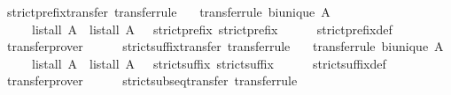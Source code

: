 \begin{isabellebody}
%
\isadelimproof
\isanewline
%
\endisadelimproof
\isanewline
{}\isamarkupfalse%
\ strict{\isacharunderscore}prefix{\isacharunderscore}transfer\ {\isacharbrackleft}transfer{\isacharunderscore}rule{\isacharbrackright}{\isacharcolon}\isanewline
\ \ \ {\isacharbrackleft}transfer{\isacharunderscore}rule{\isacharbrackright}{\isacharcolon}\ {\isachardoublequoteopen}bi{\isacharunderscore}unique\ A{\isachardoublequoteclose}\isanewline
\ \ \ \ \ {\isachardoublequoteopen}{\isacharparenleft}list{\isacharunderscore}all{}\ A\ {\isacharequal}{\isacharequal}{\isacharequal}{\isachargreater}\ list{\isacharunderscore}all{}\ A\ {\isacharequal}{\isacharequal}{\isacharequal}{\isachargreater}\ {\isacharparenleft}{\isacharequal}{\isacharparenright}{\isacharparenright}\ strict{\isacharunderscore}prefix\ strict{\isacharunderscore}prefix{\isachardoublequoteclose}\ \ \isanewline
%
\isadelimproof
\ \ %
\endisadelimproof
%
\isatagproof
{}\isamarkupfalse%
\ strict{\isacharunderscore}prefix{\isacharunderscore}def\ \isamarkupfalse%
\ transfer{\isacharunderscore}prover%
\endisatagproof
{\isafoldproof}%
%
\isadelimproof
\isanewline
%
\endisadelimproof
\ \ \ \ \isanewline
{}\isamarkupfalse%
\ strict{\isacharunderscore}suffix{\isacharunderscore}transfer\ {\isacharbrackleft}transfer{\isacharunderscore}rule{\isacharbrackright}{\isacharcolon}\isanewline
\ \ \ {\isacharbrackleft}transfer{\isacharunderscore}rule{\isacharbrackright}{\isacharcolon}\ {\isachardoublequoteopen}bi{\isacharunderscore}unique\ A{\isachardoublequoteclose}\isanewline
\ \ \ \ \ {\isachardoublequoteopen}{\isacharparenleft}list{\isacharunderscore}all{}\ A\ {\isacharequal}{\isacharequal}{\isacharequal}{\isachargreater}\ list{\isacharunderscore}all{}\ A\ {\isacharequal}{\isacharequal}{\isacharequal}{\isachargreater}\ {\isacharparenleft}{\isacharequal}{\isacharparenright}{\isacharparenright}\ strict{\isacharunderscore}suffix\ strict{\isacharunderscore}suffix{\isachardoublequoteclose}\ \ \isanewline
%
\isadelimproof
\ \ %
\endisadelimproof
%
\isatagproof
{}\isamarkupfalse%
\ strict{\isacharunderscore}suffix{\isacharunderscore}def\ \isamarkupfalse%
\ transfer{\isacharunderscore}prover%
\endisatagproof
{\isafoldproof}%
%
\isadelimproof
\isanewline
%
\endisadelimproof
\ \ \ \ \isanewline
{}\isamarkupfalse%
\ strict{\isacharunderscore}subseq{\isacharunderscore}transfer\ {\isacharbrackleft}transfer{\isacharunderscore}rule{\isacharbrackright}{\isacharcolon}\isanewline

\end{isabellebody}
